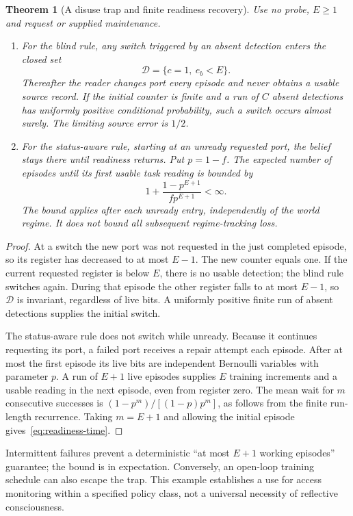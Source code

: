 \documentclass[11pt,a4paper]{article}
\newtheorem{theorem}[proposition]{Theorem}
\begin{document}
\begin{theorem}[A disuse trap and finite readiness recovery]
\label{thm:readiness-recovery}
Use no probe, $E\geq1$ and request or supplied maintenance.
\begin{enumerate}
\item For the blind rule, any switch triggered by an absent detection
enters the closed set
\[
 \mathcal D=\{c=1,\ e_b<E\}.
\]
Thereafter the reader changes port every episode and never obtains a
usable source record. If the initial counter is finite and a run of
$C$ absent detections has uniformly positive conditional probability,
such a switch occurs almost surely. The limiting source error is
$1/2$.
\item For the status-aware rule, starting at an unready requested
port, the belief stays there until readiness returns. Put $p=1-f$.
The expected number of episodes until its first usable task reading
is bounded by
\begin{equation}\label{eq:readiness-time}
 1+\frac{1-p^{E+1}}{f p^{E+1}}<\infty.
\end{equation}
The bound applies after each unready entry, independently of the
world regime. It does not bound all subsequent regime-tracking loss.
\end{enumerate}
\end{theorem}
\begin{proof}
At a switch the new port was not requested in the just completed
episode, so its register has decreased to at most $E-1$. The new
counter equals one. If the current requested register is below $E$,
there is no usable detection; the blind rule switches again. During
that episode the other register falls to at most $E-1$, so
$\mathcal D$ is invariant, regardless of live bits. A uniformly
positive finite run of absent detections supplies the initial switch.

The status-aware rule does not switch while unready. Because it
continues requesting its port, a failed port receives a repair
attempt each episode. After at most the first episode its live bits
are independent Bernoulli variables with parameter $p$. A run of
$E+1$ live episodes supplies $E$ training increments and a usable
reading in the next episode, even from register zero. The mean wait
for $m$ consecutive successes is $(1-p^m)/[(1-p)p^m]$, as follows
from the finite run-length recurrence. Taking $m=E+1$ and allowing
the initial episode gives~\eqref{eq:readiness-time}.
\end{proof}

Intermittent failures prevent a deterministic ``at most $E+1$
working episodes'' guarantee; the bound is in expectation. Conversely,
an open-loop training schedule can also escape the trap. This example
establishes a use for access monitoring within a specified policy
class, not a universal necessity of reflective consciousness.
\end{document}
